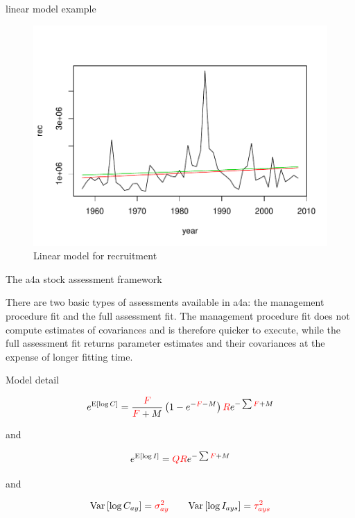 \documentclass{beamer}\usepackage[]{graphicx}\usepackage[]{color}
\makeatletter
\def\maxwidth{ %
  \ifdim\Gin@nat@width>\linewidth
    \linewidth
  \else
    \Gin@nat@width
  \fi
}
\newenvironment{knitrout}{}{} %
\makeatother
\begin{document}
\begin{frame}{linear model example}
\begin{knitrout}
\color{fgcolor}\begin{figure}[]

\includegraphics[width=\maxwidth]{figure/unnamed-chunk-2} \caption[Linear model for recruitment]{Linear model for recruitment\label{fig:unnamed-chunk-2}}
\end{figure}


\end{knitrout}


\end{frame}

\begin{frame}{The a4a stock assessment framework}

There are two basic types of assessments available in a4a: the management procedure fit and the full assessment fit. The management procedure fit does not compute estimates of covariances and is therefore quicker to execute, while the full assessment fit returns parameter estimates and their covariances at the expense of longer fitting time.

\end{frame}

\begin{frame}{Model detail}

\begin{equation*}
e^{\text{E}\left[\log C\right]} = \frac{\color{red}F}{{\color{red}F}+M}\left(1 - e^{-{\color{red}F}-M}\right) {\color{red}R}e^{-\sum {\color{red}F} + M}
\end{equation*}

and

\begin{equation*}
e^{\text{E}\left[\log I\right]} = {\color{red}Q} {\color{red}R}e^{-\sum {\color{red}F} + M}
\end{equation*}

and

\begin{equation*}
\text{Var}\left[\log C_{ay}\right] = {\color{red}\sigma^2_{ay}} \qquad \text{Var}\left[\log I_{ays}\right] = {\color{red}\tau^2_{ays}}
\end{equation*}

\end{frame} 
\end{document}
